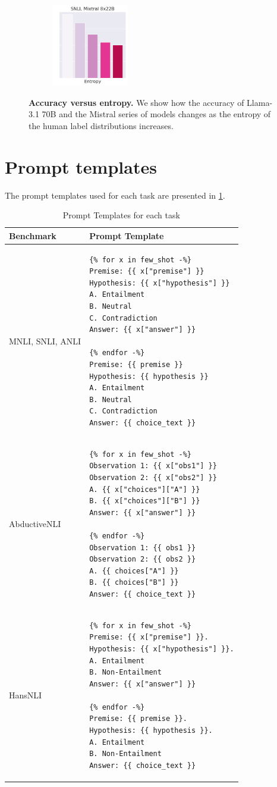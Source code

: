 \begin{figure}[t]
    \begin{subfigure}[b]{0.23\textwidth}
        \includegraphics[height=3.6cm]{figures/appendix/entropy_acc_snli_8x22B}
    \end{subfigure}
    \caption{\textbf{Accuracy versus entropy.} We show how the accuracy of Llama-3.1 70B and the Mistral series of models changes as the entropy of the human label distributions increases.}
    \label{fig:entropy_accuracy_all}
\end{figure}

\section{Prompt templates}

The prompt templates used for each task are presented in \cref{tab:prompt_template}.

\begin{table}[t]
    \centering
    \small
    \begin{tabular}{lp{8cm}}
        \textbf{Benchmark} & \textbf{Prompt Template} \\
        \midrule
        MNLI, SNLI, ANLI & \begin{verbatim}
{% for x in few_shot -%}
Premise: {{ x["premise"] }}
Hypothesis: {{ x["hypothesis"] }}
A. Entailment
B. Neutral
C. Contradiction
Answer: {{ x["answer"] }}

{% endfor -%}
Premise: {{ premise }}
Hypothesis: {{ hypothesis }}
A. Entailment
B. Neutral
C. Contradiction
Answer: {{ choice_text }}
\end{verbatim} \\
\midrule
AbductiveNLI & \begin{verbatim}
{% for x in few_shot -%}
Observation 1: {{ x["obs1"] }}
Observation 2: {{ x["obs2"] }}
A. {{ x["choices"]["A"] }}
B. {{ x["choices"]["B"] }}
Answer: {{ x["answer"] }}

{% endfor -%}
Observation 1: {{ obs1 }}
Observation 2: {{ obs2 }}
A. {{ choices["A"] }}
B. {{ choices["B"] }}
Answer: {{ choice_text }}
\end{verbatim} \\
\midrule
HansNLI & \begin{verbatim}
{% for x in few_shot -%}
Premise: {{ x["premise"] }}.
Hypothesis: {{ x["hypothesis"] }}.
A. Entailment
B. Non-Entailment
Answer: {{ x["answer"] }}

{% endfor -%}
Premise: {{ premise }}.
Hypothesis: {{ hypothesis }}.
A. Entailment
B. Non-Entailment
Answer: {{ choice_text }}
\end{verbatim} \\
\end{tabular}
\caption{Prompt Templates for each task}
\label{tab:prompt_template}
\end{table}

